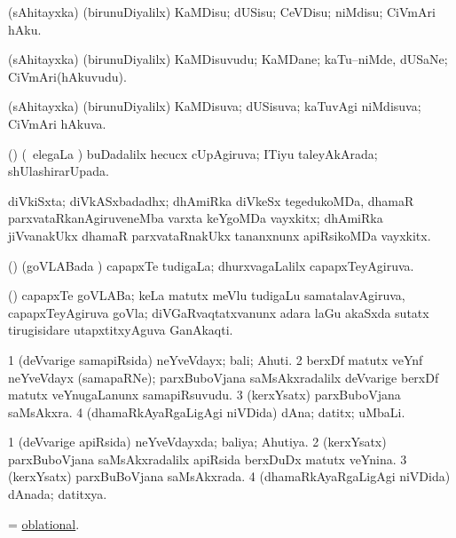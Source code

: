 \bentry
{}
\gl{\sakirx}
\bmng
(sAhitayxka) (birunuDiyalilx) KaMDisu; dUSisu; CeVDisu; niMdisu; CiVmAri hAku. 
\emng
\eentry

\bentry
{}
\gl{\nA}
\bmng
(sAhitayxka) (birunuDiyalilx) KaMDisuvudu; KaMDane; kaTu--niMde, dUSaNe; CiVmAri(hAkuvudu). 
\emng
\eentry

\bentry
{}
\gl{\gu}
\bmng
(sAhitayxka) (birunuDiyalilx) KaMDisuva; dUSisuva; kaTuvAgi niMdisuva; CiVmAri hAkuva. 
\emng
\eentry

\bentry
{}
\gl{\gu}
\bmng
(\savi) (\kanmu\ elegaLa \vi) buDadalilx hecucx cUpAgiruva; ITiyu taleyAkArada; shUlashirarUpada. 
\emng
\eentry

\bentry
{}
\gl{\nA}
\bmng
diVkiSxta; diVkASxbadadhx; dhAmiRka diVkeSx tegedukoMDa, dhamaR parxvataRkanAgiruveneMba varxta keYgoMDa vayxkitx; dhAmiRka jiVvanakUkx dhamaR parxvataRnakUkx tananxnunx apiRsikoMDa vayxkitx. 
\emng
\eentry

\bentry
{}
\gl{\gu}
\bmng
(\jAyx) (goVLABada \vi) capapxTe tudigaLa; dhurxvagaLalilx capapxTeyAgiruva. 
\emng
\eentry

\bentry
{}
\gl{\nA}
\bmng
(\jAyx) capapxTe goVLABa; keLa matutx meVlu tudigaLu samatalavAgiruva, capapxTeyAgiruva goVla; diVGaRvaqtatxvanunx adara laGu akaSxda sutatx tirugisidare utapxtitxyAguva GanAkaqti. 
\emng
\eentry

\bentry
{}
\gl{\nA}
\bmng
\bnum
\num{1} (deVvarige samapiRsida) neYveVdayx; bali; Ahuti. 
\num{2} berxDf matutx veYnf neYveVdayx (samapaRNe); parxBuboVjana saMsAkxradalilx deVvarige berxDf matutx veYnugaLanunx samapiRsuvudu. 
\num{3} (kerxYsatx) parxBuboVjana saMsAkxra. 
\num{4} (dhamaRkAyaRgaLigAgi niVDida) dAna; datitx; uMbaLi. 
\enum
\emng
\eentry

\bentry
{}
\gl{\gu}
\bmng
\bnum
\num{1} (deVvarige apiRsida) neYveVdayxda; baliya; Ahutiya. 
\num{2} (kerxYsatx) parxBuboVjana saMsAkxradalilx apiRsida berxDuDx matutx veYnina. 
\num{3} (kerxYsatx) parxBuBoVjana saMsAkxrada. 
\num{4} (dhamaRkAyaRgaLigAgi niVDida) dAnada; datitxya. 
\enum
\emng
\eentry

\bentry
{}
\gl{\gu}
\bmng
= \hyperlink{oblational}{oblational}. 
\emng
\eentry

